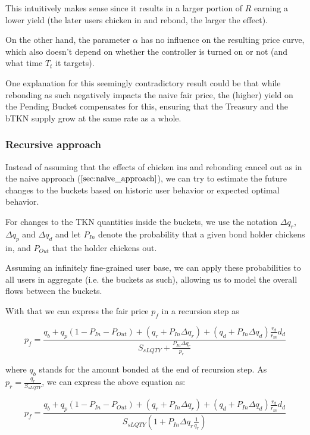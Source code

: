 \documentclass{article}
\begin{document}
This intuitively makes sense since it results in a larger portion of $R$ earning a lower yield (the later users chicken in and rebond, the larger the effect). 

On the other hand, the parameter $\alpha$ has no influence on the resulting price curve, which also doesn't depend on whether the controller is turned on or not (and what time $T_t$ it targets).

One explanation for this seemingly contradictory result could be that while rebonding as such negatively impacts the naive fair price, the (higher) yield on the Pending Bucket compensates for this, ensuring that the Treasury and the bTKN supply grow at the same rate as a whole.

\subsubsection{Recursive approach}
Instead of assuming that the effects of chicken ins and rebonding cancel out as in the naive approach ($\ref{sec:naive_approach}$), we can try to estimate the future changes to the buckets based on historic user behavior or expected optimal behavior.

For changes to the TKN quantities inside the buckets, we use the notation $\Delta q_{r}$, $\Delta q_{p}$ and $\Delta q_{d}$ and let $P_{In}$ denote the probability that a given bond holder chickens in, and $P_{Out}$ that the holder chickens out.

Assuming an infinitely fine-grained user base, we can apply these probabilities to all users in aggregate (i.e. the buckets as such), allowing us to model the overall flows between the buckets.

With that we can express the fair price $p_f$ in a recursion step as

\begin{equation}
  \label{}
    p_{f} = \frac{q_{b}+q_{p}(1-P_{In}-P_{Out})+(q_{r}+ P_{In}\Delta q_{r})+(q_{d} + P_{In}\Delta q_{d})\frac{r_{d}}{r_{m}}d_{d}}{S_{sLQTY} + \frac{P_{In}\Delta q_r}{p_r}}
\end{equation}

where $q_{b}$ stands for the amount bonded at the end of recursion step. As $p_r = \frac{q_r}{S_{sLQTY}}$, we can express the above equation as:

\begin{equation}
  \label{eq:recursive_hist}
    p_{f} = \frac{q_{b}+q_{p}(1-P_{In}-P_{Out})+(q_{r}+ P_{In}\Delta q_{r})+(q_{d} + P_{In}\Delta q_{d})\frac{r_{d}}{r_{m}}d_{d}}{S_{sLQTY} \left( 1+P_{In} \Delta q_{r} \frac{1}{q_{r}} \right)}
\end{equation}
\end{document}
